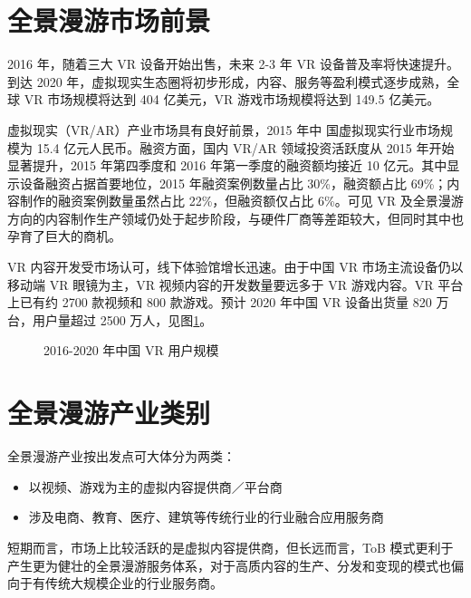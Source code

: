 \section{全景漫游市场前景}

2016 年，随着三大 VR 设备开始出售，未来 2-3 年 VR 设备普及率将快速提升。到达 2020 年，虚拟现实生态圈将初步形成，内容、服务等盈利模式逐步成熟，全球 VR 市场规模将达到 404 亿美元，VR 游戏市场规模将达到 149.5 亿美元。

虚拟现实（VR/AR）产业市场具有良好前景，2015 年中 国虚拟现实行业市场规模为 15.4 亿元人民币。融资方面，国内 VR/AR 领域投资活跃度从 2015 年开始显著提升，2015 年第四季度和 2016 年第一季度的融资额均接近 10 亿元。其中显示设备融资占据首要地位，2015 年融资案例数量占比 30\%，融资额占比 69\%；内容制作的融资案例数量虽然占比 22\%，但融资额仅占比 6\%。可见 VR 及全景漫游方向的内容制作生产领域仍处于起步阶段，与硬件厂商等差距较大，但同时其中也孕育了巨大的商机。

VR 内容开发受市场认可，线下体验馆增长迅速。由于中国 VR 市场主流设备仍以移动端 VR 眼镜为主，VR 视频内容的开发数量要远多于 VR 游戏内容。VR 平台上已有约 2700 款视频和 800 款游戏。预计 2020 年中国 VR 设备出货量 820 万台，用户量超过 2500 万人，见图\ref{fig:market}。

\begin{figure}[htp]
\centering
{}
\caption{2016-2020 年中国 VR 用户规模}
\label{fig:market}
\end{figure}

\section{全景漫游产业类别}
全景漫游产业按出发点可大体分为两类：
\begin{itemize}
	\item 以视频、游戏为主的虚拟内容提供商／平台商
	\item 涉及电商、教育、医疗、建筑等传统行业的行业融合应用服务商
\end{itemize}

短期而言，市场上比较活跃的是虚拟内容提供商，但长远而言，ToB 模式更利于产生更为健壮的全景漫游服务体系，对于高质内容的生产、分发和变现的模式也偏向于有传统大规模企业的行业服务商。

